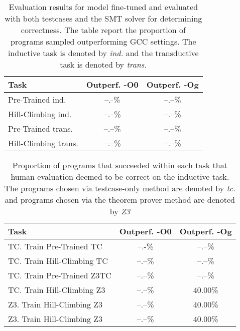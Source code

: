 \documentclass{article}
\begin{document}
\begin{table}[t]
\label{tab:z3_inner_loop_results}
\caption{Evaluation results for model fine-tuned and evaluated with both testcases and the SMT solver for determining correctness. The table report the proportion of programs sampled outperforming GCC settings. The inductive task is denoted by \textit{ind.} and the transductive task is denoted by \textit{trans.}}
\vskip 0.15in
\begin{center}
\begin{small}
\begin{sc}
\begin{tabular}{lcc}
\toprule
Task & Outperf. -O0 & Outperf. -Og \\
\midrule
Pre-Trained ind.    & --.-\% & --.--\% \\
Hill-Climbing ind.  & --.--\% & --.--\% \\
Pre-Trained trans.   & --.--\% & --.--\% \\
Hill-Climbing trans.  & --.--\% & --.--\% \\
\bottomrule
\end{tabular}
\end{sc}
\end{small}
\end{center}
\vskip -0.1in
\end{table}


\begin{table}[t]
\label{tab:manual}
\caption{Proportion of programs that succeeded within each task that human evaluation deemed to be correct on the inductive task. The programs chosen via testcase-only method are denoted by \textit{tc.} and programs chosen via the theorem prover method are denoted by \textit{Z3}}
\vskip 0.15in
\begin{center}
\begin{small}
\begin{sc}
\begin{tabular}{lcc}
\toprule
Task & Outperf. -O0 & Outperf. -Og \\
\midrule
TC. Train Pre-Trained TC    & --.-\% & --.--\% \\
TC. Train Hill-Climbing TC  & --.--\% & --.--\% \\
TC. Train Pre-Trained Z3TC   & --.--\% & --.--\% \\
TC. Train Hill-Climbing Z3  & --.--\% & 40.00\% \\
Z3. Train Hill-Climbing Z3  & --.--\% & 40.00\% \\
Z3. Train Hill-Climbing Z3  & --.--\% & 40.00\% \\
\bottomrule
\end{tabular}
\end{sc}
\end{small}
\end{center}
\vskip -0.1in
\end{table}
\end{document}
